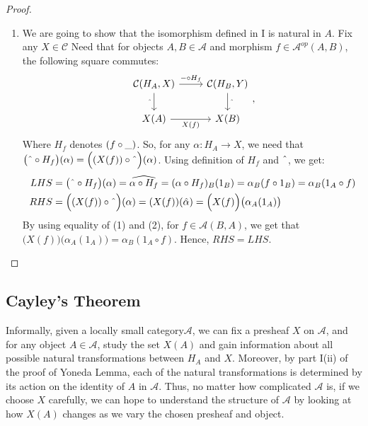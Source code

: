 \documentclass[a4paper]{article}
\theoremstyle{definition}
\begin{document}
\begin{proof}
\begin{enumerate}[label=\Roman*]
\begin{enumerate}[label=(\roman*)]
						\item We are going to show that the isomorphism
							defined in I is natural in $A$. Fix any $X \in \mathcal{C} $ Need that
							for objects $A,B \in \mathcal{A} $ and morphism $f\in \mathcal{A} ^{op}(A,B)$,
							the following square commutes:
							\begin{equation*}
								\begin{tikzcd}
									\mathcal{C}(H_A,X) \arrow[swap]{d}{ \string ^}
									\arrow{r}{- \circ H_f}
			& \mathcal{C}(H_B,Y) \arrow{d}{\string ^}\\
			X(A) \arrow[swap]{r}{X(f)}
			& X(B)
								\end{tikzcd},
							\end{equation*}
							Where $H_f$ denotes
							$(f \circ \string _ )$. So, for any $\alpha:H_A \to X$, we need that
							$\big( \string ^ \circ H_f \big)(\alpha)=\Big((X(f)) \circ \string ^ \Big)(\alpha) $.
							Using definition of $H_f$ and $\string ^$, we get:
							\begin{align}
								LHS&=\big( \string ^ \circ H_f \big)(\alpha)= \widehat{\alpha \circ H_f}
								=(\alpha \circ H_f)_B (1_B) = \alpha_B (f \circ 1_B) = \alpha_B(1_A \circ f) \\
								RHS&=\Big((X(f)) \circ \string ^ \Big)(\alpha)
								= (X(f))(\hat{\alpha})= \Big(X(f) \Big)\big(\alpha_A(1_A)\big)
							\end{align}
							By using equality of (1) and (2), for
							$f \in \mathcal{A}(B,A)$, we get that
							$\Big(X(f) \Big)\big(\alpha_A(1_A)\big)=\alpha_B( 1_A \circ f) $.
							Hence, $RHS=LHS$. \qedhere
					\end{enumerate}
			\end{enumerate}
		\end{proof}
		\subsection{Cayley's Theorem}%
		Informally, given a locally small category$\mathcal{A} $, we can fix a presheaf $X$ on $\mathcal{A}$,
		and for any object $A \in \mathcal{A} $, study the set $X(A)$ and gain information
		about all possible natural transformations between $H_A$ and $X$. Moreover, by part I(ii) of the
		proof of Yoneda Lemma, each of the natural transformations is determined by its action
		on the identity of $A$ in $\mathcal{A}$. Thus, no matter how complicated $\mathcal{A}$ is, if we choose $X$ carefully, we can hope to understand the structure of $\mathcal{A} $
		by looking at how $X(A)$ changes as we vary the chosen
		presheaf and object.
\end{document}
